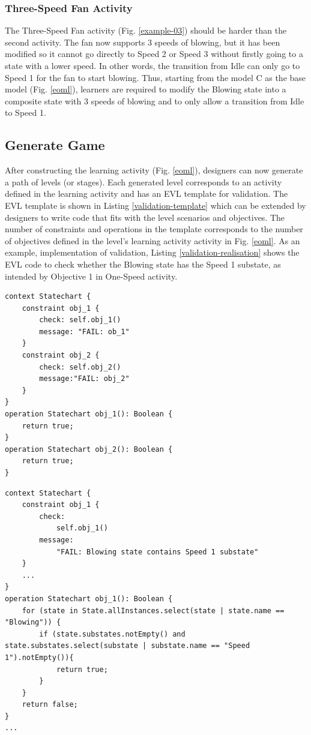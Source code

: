 \documentclass[conference]{IEEEtran}
\begin{document}
\subsubsection{Three-Speed Fan Activity}
The Three-Speed Fan activity (Fig. \ref{example-03}) should be harder than the second activity. The fan now supports 3 speeds of blowing, but it has been modified so it cannot go directly to Speed 2 or Speed 3 without firstly going to a state with a lower speed. In other words, the transition from Idle can only go to Speed 1 for the fan to start blowing. Thus, starting from the model C as the base model (Fig. \ref{eoml}), learners are required to modify the Blowing state into a composite state with 3 speeds of blowing and to only allow a transition from Idle to Speed 1.

\subsection{Generate Game}
After constructing the learning activity (Fig. \ref{eoml}), designers can now generate a path of levels (or stages). Each generated level corresponds to an activity defined in the learning activity and has an EVL template for validation. The EVL template is shown in Listing \ref{validation-template} which can be extended by designers to write code that fits with the level scenarios and objectives. The number of constraints and operations in the template corresponds to the number of objectives defined in the level's learning activity activity in Fig. \ref{eoml}. As an example, implementation of validation, Listing \ref{validation-realisation} shows the EVL code to check whether the Blowing state has the Speed 1 substate, as intended by Objective 1 in One-Speed activity.   

\begin{lstlisting}[style=interfaces,caption={Validation template for objectives in One-Speed Fan activity/level.},label=validation-template]
context Statechart {
    constraint obj_1 {
        check: self.obj_1()
        message: "FAIL: ob_1"
    }
    constraint obj_2 {
        check: self.obj_2()
        message:"FAIL: obj_2"
    }        
}
operation Statechart obj_1(): Boolean {
    return true;
}
operation Statechart obj_2(): Boolean {
    return true;
}
\end{lstlisting} 


\begin{lstlisting}[style=interfaces,caption={Validation realisation for Objective 1 in One-Speed Fan activity/level.}, label=validation-realisation]
context Statechart {
    constraint obj_1 {
        check: 
            self.obj_1()
        message:
            "FAIL: Blowing state contains Speed 1 substate"
    }
    ...
}
operation Statechart obj_1(): Boolean {
    for (state in State.allInstances.select(state | state.name == "Blowing")) {
        if (state.substates.notEmpty() and state.substates.select(substate | substate.name == "Speed 1").notEmpty()){
            return true;
        }        
    }
    return false;
}
...
\end{lstlisting} 
\end{document}
